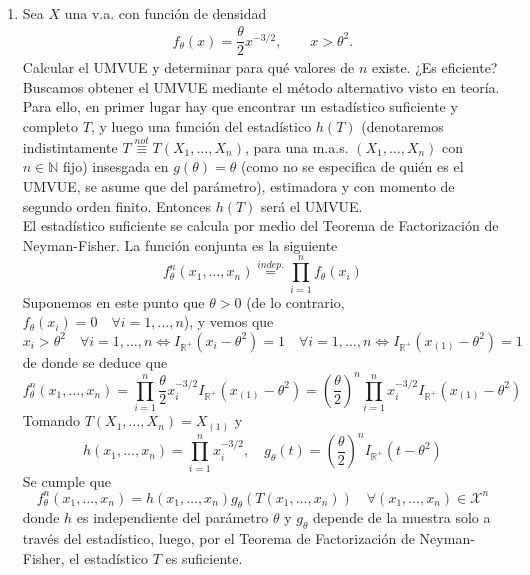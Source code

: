 \documentclass[12pt]{article}
\newcommand{\R}{\mathbb{R}}
\newcommand{\Rmas}{\R^{+}}
\newcommand{\X}{\mathcal{X}}
\newcommand{\N}{\mathbb{N}}
\begin{document}
    \begin{ejercicio}~
        \begin{enumerate}
            \item[a)] Sea $X$ una v.a. con función de densidad
            \begin{gather}
                f_\theta(x)=\dfrac{\theta}{2} x^{-3/2}, \qquad x>\theta^2.
                \tag{2}
            \end{gather}
            Calcular el UMVUE y determinar para qué valores de $n$ existe.
            ¿Es eficiente? \\

            Buscamos obtener el UMVUE mediante el método alternativo visto en teoría. Para ello, en primer lugar hay que encontrar un estadístico suficiente y completo $T$, y luego una función del estadístico $h(T)$
            (denotaremos indistintamente $T \stackrel{not}{\equiv} T(X_1, \ldots, X_n)$, para una m.a.s. $(X_1, \ldots, X_n)$ con $n \in \N$ fijo) insesgada en 
            $g(\theta) = \theta$ (como no se especifica de quién es el UMVUE, se asume que del parámetro), estimadora y con momento de segundo orden finito. Entonces $h(T)$ será el UMVUE. \\

            El estadístico suficiente se calcula por medio del Teorema de Factorización de Neyman-Fisher. La función conjunta es la siguiente
            $$f^n_\theta(x_1, \ldots, x_n) \stackrel{indep.}{=} \prod_{i=1}^{n} f_\theta(x_i)$$
            Suponemos en este punto que $\theta > 0$ (de lo contrario, $f_\theta(x_i) = 0 \quad \forall i = 1, \ldots, n$), y 
            vemos que $$x_i > \theta^2 \quad \forall i = 1, \ldots, n \iff I_{\Rmas}(x_i - \theta^2) = 1 \quad \forall 
            i = 1, \ldots, n \iff I_{\Rmas}(x_{(1)} - \theta^2) = 1$$ de donde se deduce que 
            $$f^n_\theta(x_1, \ldots, x_n) = \prod_{i=1}^{n} \dfrac{\theta}{2} x_i^{-3/2} I_{\Rmas}(x_{(1)} - \theta^2) = 
            \left(\dfrac{\theta}{2} \right)^{n} \prod_{i=1}^{n} x_i^{-3/2} I_{\Rmas}(x_{(1)} - \theta^2)$$
            Tomando $T(X_1, \ldots, X_n) = X_{(1)}$ y 
            $$h(x_1, \ldots, x_n) = \prod_{i=1}^{n} x_i^{-3/2}, \quad g_\theta(t) = 
            \left(\dfrac{\theta}{2} \right)^{n} I_{\Rmas}(t - \theta^2)$$
            Se cumple que 
            $$f^n_\theta(x_1, \ldots, x_n) = h(x_1, \ldots, x_n) g_\theta(T(x_1, \ldots, x_n)) \quad \forall (x_1, \ldots, x_n) \in \X^n$$
            donde $h$ es independiente del parámetro $\theta$ y $g_\theta$ depende de la muestra solo a través del estadístico, luego,
            por el Teorema de Factorización de Neyman-Fisher, el estadístico $T$ es suficiente. 


\end{enumerate}
\end{ejercicio}
\end{document}
